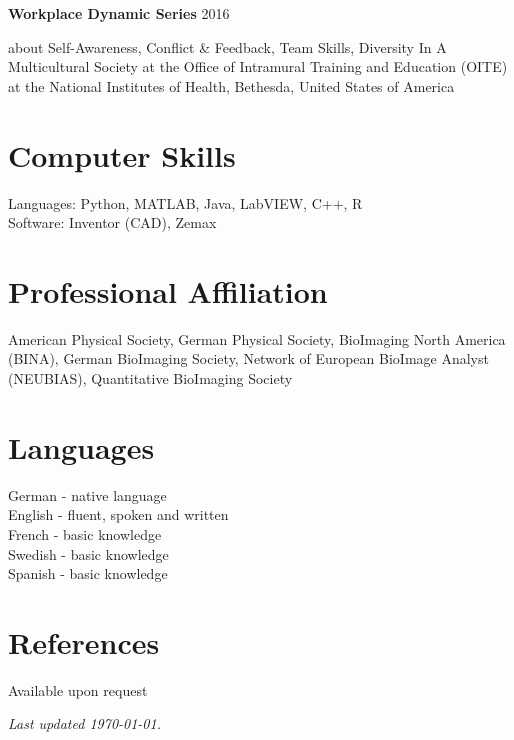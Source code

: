 \documentclass[margin,line]{res}
\begin{document}
\begin{resume}
\vspace*{-2mm}

{\bf Workplace Dynamic Series} \hfill {2016}\\
\vspace*{-3.5mm}
\begin{addmargin}[0pt]{.1\linewidth}
\vspace*{-1mm}
about Self-Awareness, Conflict \& Feedback, Team Skills, Diversity In A Multicultural Society at the Office of Intramural Training and Education (OITE) at the National Institutes of Health, Bethesda, United States of America
\end{addmargin}


\section{\sc Computer Skills} 

Languages:  Python, MATLAB, Java, LabVIEW, C++, R\\
Software: Inventor (CAD), Zemax


\section{\sc Professional Affiliation} 
American Physical Society, German Physical Society, BioImaging North America (BINA), German BioImaging Society, Network of European BioImage Analyst (NEUBIAS), Quantitative BioImaging Society


\section{\sc Languages} 
German - native language\\English  - fluent, spoken and written  \\French - basic knowledge \\Swedish - basic knowledge \\Spanish - basic knowledge


\section{\sc References} 
Available upon request

\vfill
 \hfill \emph{Last updated {\today}.}

\end{resume}
\end{document}
